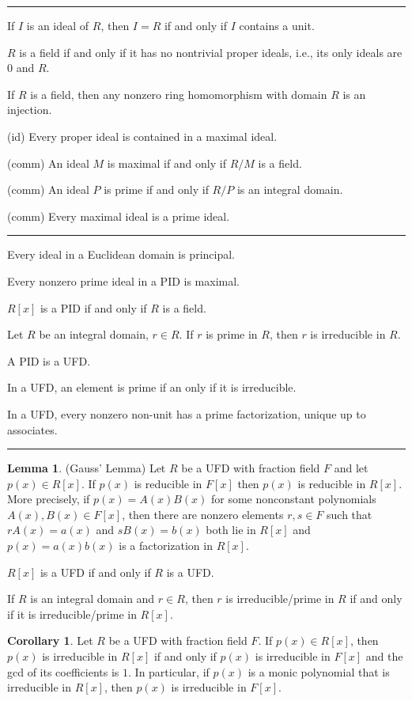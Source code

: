 \documentclass[12pt]{article}
\newcommand{\sepline}{\rule{\textwidth}{0.4pt}}
\theoremstyle{definition}
\newtheorem{corollary}{Corollary}
\newtheorem{lemma}{Lemma}
\newcommand{\<}{\left\langle}
\renewcommand{\>}{\right\rangle}
\begin{document}
\sepline

If $I$ is an ideal of $R$, then $I = R$ if and only if $I$ contains a unit.

$R$ is a field if and only if it has no nontrivial proper ideals, i.e., its only ideals are $0$ and $R$.

If $R$ is a field, then any nonzero ring homomorphism with domain $R$ is an injection.

(id) Every proper ideal is contained in a maximal ideal.

(comm) An ideal $M$ is maximal if and only if $R/M$ is a field.

(comm) An ideal $P$ is prime if and only if $R/P$ is an integral domain.

(comm) Every maximal ideal is a prime ideal.

\sepline

Every ideal in a Euclidean domain is principal.

Every nonzero prime ideal in a PID is maximal.

$R[x]$ is a PID if and only if $R$ is a field.

Let $R$ be an integral domain, $r \in R$. If $r$ is prime in $R$, then $r$ is irreducible in $R$.

A PID is a UFD.

In a UFD, an element is prime if an only if it is irreducible.

In a UFD, every nonzero non-unit has a prime factorization, unique up to associates.


\sepline

\begin{lemma}(Gauss' Lemma)
    Let $R$ be a UFD with fraction field $F$ and let $p(x) \in R[x]$. If $p(x)$ is reducible in $F[x]$ then $p(x)$ is reducible in $R[x]$. More precisely, if $p(x) = A(x)B(x)$ for some nonconstant polynomials $A(x), B(x) \in F[x]$, then there are nonzero elements $r, s \in F$ such that $rA(x) = a(x)$ and $sB(x) = b(x)$ both lie in $R[x]$ and $p(x) = a(x)b(x)$ is a factorization in $R[x]$.
\end{lemma}

$R[x]$ is a UFD if and only if $R$ is a UFD.

If $R$ is an integral domain and $r \in R$, then $r$ is irreducible/prime in $R$ if and only if it is irreducible/prime in $R[x]$.

\begin{corollary}
    Let $R$ be a UFD with fraction field $F$. If $p(x) \in R[x]$, then $p(x)$ is irreducible in $R[x]$ if and only if $p(x)$ is irreducible in $F[x]$ and the gcd of its coefficients is $1$. In particular, if $p(x)$ is a monic polynomial that is irreducible in $R[x]$, then $p(x)$ is irreducible in $F[x]$.
\end{corollary}
\end{document}
